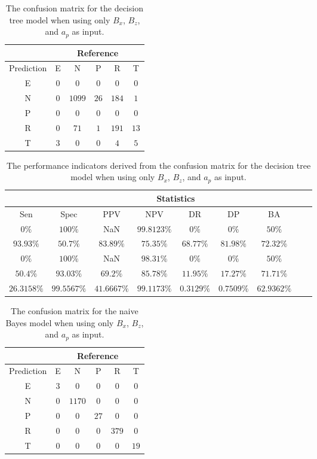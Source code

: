 \begin{table}[!ht]
	\centering
	\begin{tabular}{|c|c|c|c|c|c|}
		\hline
		 & \multicolumn{5}{|c|}{Reference} \\ \hline
		 Prediction & E & N & P & R & T \\ \hline
		 E & $0$ & $0$ & $0$ & $0$ & $0$ \\ \hline
		 N & $0$ & $1099$ & $26$ & $184$ & $1$ \\ \hline
		 P & $0$ & $0$ & $0$ & $0$ & $0$ \\ \hline
		 R & $0$ & $71$ & $1$ & $191$ & $13$ \\ \hline
		 T & $3$ & $0$ & $0$ & $4$ & $5$ \\ \hline
	\end{tabular}
	\caption{The confusion matrix for the decision tree model when using only $B_{x}$, $B_{z}$, and $a_{p}$ as input.}
	\label{tab:cm:xzap:C5.0}
\end{table}

\begin{table}[!ht]
	\centering
	\begin{tabular}{|c|c|c|c|c|c|c|c|c|}
		\hline
		 & \multicolumn{7}{c|}{Statistics} \\ \hline
		Sen & Spec & PPV & NPV & DR & DP & BA \\ \hline
		$0\%$ & $100\%$ & NaN & $99.8123\%$ & $0\%$ & $0\%$ & $50\%$ \\ \hline
		$93.93\%$ & $50.7\%$ & $83.89\%$ & $75.35\%$ & $68.77\%$ & $81.98\%$ & $72.32\%$ \\ \hline
		$0\%$ & $100\%$ & NaN & $98.31\%$ & $0\%$ & $0\%$ & $50\%$ \\ \hline
		$50.4\%$ & $93.03\%$ & $69.2\%$ & $85.78\%$ & $11.95\%$ & $17.27\%$ & $71.71\%$ \\ \hline
		$26.3158\%$ & $99.5567\%$ & $41.6667\%$ & $99.1173\%$ & $0.3129\%$ & $0.7509\%$ & $62.9362\%$ \\ \hline
	\end{tabular}
	\caption{The performance indicators derived from the confusion matrix for the decision tree model when using only $B_{x}$, $B_{z}$, and $a_{p}$ as input.}
	\label{tab:cs:xzap:C5.0}
\end{table}

\begin{table}[!ht]
	\centering
	\begin{tabular}{|c|c|c|c|c|c|}
		\hline
		 & \multicolumn{5}{|c|}{Reference} \\ \hline
		 Prediction & E & N & P & R & T \\ \hline
		 E & $3$ & $0$ & $0$ & $0$ & $0$ \\ \hline
		 N & $0$ & $1170$ & $0$ & $0$ & $0$ \\ \hline
		 P & $0$ & $0$ & $27$ & $0$ & $0$ \\ \hline
		 R & $0$ & $0$ & $0$ & $379$ & $0$ \\ \hline
		 T & $0$ & $0$ & $0$ & $0$ & $19$ \\ \hline
	\end{tabular}
	\caption{The confusion matrix for the naive Bayes model when using only $B_{x}$, $B_{z}$, and $a_{p}$ as input.}
	\label{tab:cm:xzap:nb}
\end{table}

